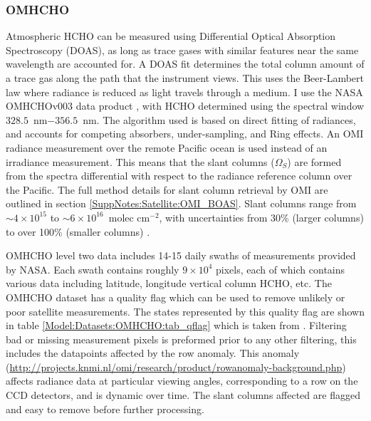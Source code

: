     \subsubsection{OMHCHO}
      \label{Model:Datasets:OMHCHO}
      
      Atmospheric HCHO can be measured using Differential Optical Absorption Spectroscopy (DOAS), as long as trace gases with similar features near the same wavelength are accounted for.
      A DOAS fit determines the total column amount of a trace gas along the path that the instrument views.
      This uses the Beer-Lambert law where radiance is reduced as light travels through a medium.
      I use the NASA OMHCHOv003 data product \parencite{Abad2015}, with HCHO determined using the spectral window $328.5$~nm$ - 356.5$~nm. 
      The algorithm used is based on direct fitting of radiances, and accounts for competing absorbers, under-sampling, and Ring effects.
      An OMI radiance measurement over the remote Pacific ocean is used instead of an irradiance measurement.
      This means that the slant columns ($\Omega_S$) are formed from the spectra differential with respect to the radiance reference column over the Pacific.
      The full method details for slant column retrieval by OMI are outlined in section \ref{SuppNotes:Satellite:OMI_BOAS}.
      Slant columns range from $\sim 4\times 10^{15} $ to $\sim 6 \times 10^{16}$~molec cm$^{-2}$, with uncertainties from 30\% (larger columns) to over 100\% (smaller columns) \parencite{Abad2015}.
      
      
      OMHCHO level two data includes 14-15 daily swaths of measurements provided by NASA.
      Each swath contains roughly $9 \times 10^4$ pixels, each of which contains various data including latitude, longitude vertical column HCHO, etc.
      The OMHCHO dataset has a quality flag which can be used to remove unlikely or poor satellite measurements.
      The states represented by this quality flag are shown in table \ref{Model:Datasets:OMHCHO:tab_qflag} which is taken from \textcite{Kurosu2014}.
      Filtering bad or missing measurement pixels is preformed prior to any other filtering, this includes the datapoints affected by the row anomaly.
      This anomaly (\url{http://projects.knmi.nl/omi/research/product/rowanomaly-background.php}) affects radiance data at particular viewing angles, corresponding to a row on the CCD detectors, and is dynamic over time.
      The slant columns affected are flagged and easy to remove before further processing.
      

